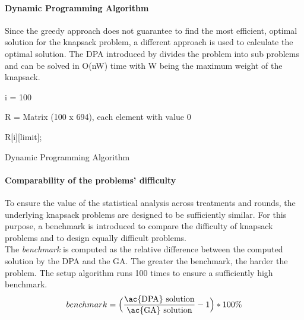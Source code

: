 \paragraph{Dynamic Programming Algorithm}
\label{par:DynamicProgrammingAlgorithm}
Since the greedy approach does not guarantee to find the most efficient, optimal solution for the knapsack problem, a different approach is used to calculate the optimal solution. The \ac{DPA} introduced by \cite{Kleinberg2005}  divides the problem into sub problems and can be solved in O(nW) time with W being the maximum weight of the knapsack.
\begin{algorithm} %
\LinesNumbered
\setcounter{AlgoLine}{0}
\SetNoFillComment
 \SetAlgoLined
 
i = 100\;

R = Matrix (100 x 694), each element with value 0\;

\Return R[i][limit]; 
\caption{Dynamic Programming Algorithm}
\end{algorithm}
\paragraph{Comparability of the problems' difficulty}
To ensure the value of the statistical analysis across treatments and rounds, the underlying knapsack problems are designed to be sufficiently similar. For this purpose, a benchmark is introduced to compare the difficulty of knapsack problems and to design equally difficult problems.\\
The \textit{benchmark} is computed as the relative difference between the computed solution by the \ac{DPA} and the \ac{GA}. The greater the benchmark, the harder the problem.
The setup algorithm runs 100 times to ensure a sufficiently high benchmark.
\begin{equation}
benchmark = \Big(\dfrac{\text{\ac{DPA} solution}}{\text{\ac{GA} solution}} -1\Big) * 100\%
\end{equation}

